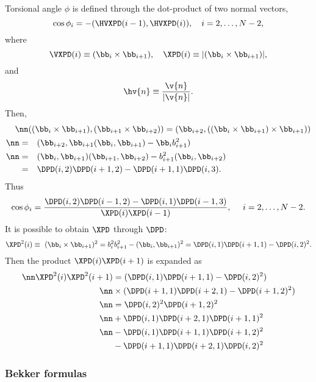 Torsional angle $\phi$ is defined through the dot-product of two normal vectors,
\begin{equation}
  \cos\phi_{i}=-(\HVXPD(i-1),\HVXPD(i)),\quad i=2,\ldots,N-2,
\end{equation}
where
\begin{equation}
\VXPD(i)\equiv (\bb_i\times\bb_{i+1}),\quad
\XPD(i)\equiv|(\bb_i\times\bb_{i+1})|,
\end{equation}
and
\begin{equation}
  \hv{n}\equiv \frac{\v{n}}{|\v{n}|}.
\end{equation}
Then,
\begin{align}
\nn&((\bb_i\times\bb_{i+1}),(\bb_{i+1}\times\bb_{i+2}))=
(\bb_{i+2},((\bb_i\times\bb_{i+1})\times\bb_{i+1}))\\
\nn=&\quad(\bb_{i+2},\bb_{i+1}(\bb_i,\bb_{i+1})-\bb_ib_{i+1}^2)\\
\nn=&\quad(\bb_i,\bb_{i+1})(\bb_{i+1},\bb_{i+2})-b_{i+1}^2(\bb_i,\bb_{i+2})\\
=&\quad\DPD(i,2)\DPD(i+1,2)-\DPD(i+1,1)\DPD(i,3).
\end{align}
Thus
\begin{equation}
  \cos\phi_{i}=\frac{\DPD(i,2)\DPD(i-1,2)-\DPD(i,1)\DPD(i-1,3)}{\XPD(i)\XPD(i-1)},
  \quad\ i=2,\ldots,N-2.
  \label{bln-def-tangle}
\end{equation}
It is possible to obtain $\XPD$ through $\DPD$:
\begin{equation}
  \XPD^2(i)\equiv\ (\bb_i\times\bb_{i+1})^2
  =b_i^2b_{i+1}^2-(\bb_i,\bb_{i+1})^2
  =\DPD(i,1)\DPD(i+1,1)-\DPD(i,2)^2.
\end{equation}
Then the product $\XPD(i)\XPD(i+1)$ is expanded as
\begin{align}
  \nn\XPD^2(i)\XPD^2(i+1)&={(\DPD(i,1)\DPD(i+1,1)-\DPD(i,2)^2)}\\
  \nn&\times{(\DPD(i+1,1)\DPD(i+2,1)-\DPD(i+1,2)^2)}\\
  \nn&=\DPD(i,2)^2\DPD(i+1,2)^2\\
  \nn&+\DPD(i,1)\DPD(i+2,1)\DPD(i+1,1)^2\\
  \nn&-\DPD(i,1)\DPD(i+1,1)\DPD(i+1,2)^2\\
  &-\DPD(i+1,1)\DPD(i+2,1)\DPD(i,2)^2
\end{align}

\subsubsection{Bekker formulas}

